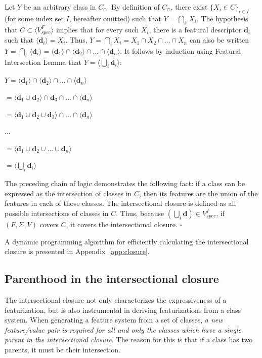 \documentclass[12pt, oneside]{article}   	%
\begin{document}
Let $Y$ be an arbitrary class in $C_\cap$. By definition of $C_\cap$, there exist $\{X_i \in C\}_{i \in I}$ (for some index set $I$, hereafter omitted) such that $Y = \bigcap_i \, X_i$. The hypothesis that $C \subset \langle V_{spec}^F \rangle $ implies that for every such $X_i$, there is a featural descriptor $\mathbf{d}_i$ such that $\langle \mathbf{d}_i \rangle = X_i$. Thus, $Y = \bigcap_i X_i = X_1 \cap X_2 \cap \ldots \cap X_n$ can also be written $Y = \bigcap_i \, \langle \mathbf{d}_i \rangle = \langle \mathbf{d}_1 \rangle \cap \langle \mathbf{d}_2 \rangle \cap \ldots \cap \langle \mathbf{d}_n \rangle$. It follows by induction using Featural Intersection Lemma that $Y = \langle \bigcup_i \mathbf{d}_i \rangle$:

$Y = \langle \mathbf{d}_1 \rangle \cap  \langle \mathbf{d}_2 \rangle \cap \ldots \cap  \langle \mathbf{d}_n \rangle$

\quad $ = \langle \mathbf{d}_1 \cup \mathbf{d}_2 \rangle \cap \mathbf{d}_3 \cap \ldots \cap \langle \mathbf{d}_n \rangle$

\quad $ = \langle \mathbf{d}_1 \cup \mathbf{d}_2 \cup \mathbf{d}_3 \rangle \cap \ldots \cap \langle \mathbf{d}_n \rangle$

\quad $\ldots$

\quad $= \langle \mathbf{d}_1 \cup \mathbf{d}_2 \cup \ldots \cup \mathbf{d}_n \rangle$

\quad $= \langle \bigcup_i  \mathbf{d}_i \rangle$

\noindent The preceding chain of logic demonstrates the following fact: if a class can be expressed as the intersection of classes in $C$, then its features are the union of the features in each of those classes. The intersectional closure is defined as all possible intersections of classes in $C$. Thus, because $(\bigcup_i \mathbf{d}) \in V_{spec}^f$, if $(F, \Sigma, V)$ covers $C$, it covers the intersectional closure. $\square$

\vspace{0.5\baselineskip} A dynamic programming algorithm for efficiently calculating the intersectional closure is presented in Appendix~\ref{app:closure}.

\subsection{Parenthood in the intersectional closure}
\label{sec:intersection_proof}

The intersectional closure not only characterizes the expressiveness of a featurization, but is also instrumental in deriving featurizations from a class system. When generating a feature system from a set of classes, \textit{a new feature/value pair is required for all and only the classes which have a single parent in the intersectional closure}. The reason for this is that if a class has two parents, it must be their intersection.
\end{document}

